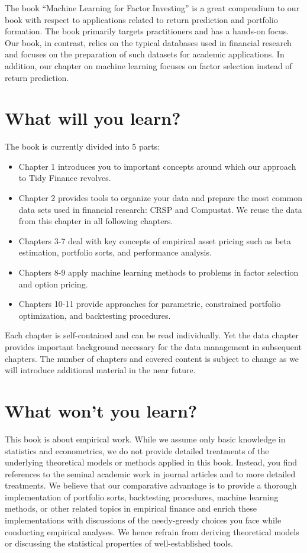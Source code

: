 \documentclass[
]{book}
\providecommand{\tightlist}{%
  \setlength{\itemsep}{0pt}\setlength{\parskip}{0pt}}
\begin{document}
The book ``Machine Learning for Factor Investing'' is a great compendium to our book with respect to applications related to return prediction and portfolio formation. The book primarily targets practitioners and has a hands-on focus. Our book, in contrast, relies on the typical databases used in financial research and focuses on the preparation of such datasets for academic applications. In addition, our chapter on machine learning focuses on factor selection instead of return prediction.

\hypertarget{what-will-you-learn}{%
\section*{What will you learn?}\label{what-will-you-learn}}


The book is currently divided into 5 parts:

\begin{itemize}
\tightlist
\item
  Chapter 1 introduces you to important concepts around which our approach to Tidy Finance revolves.
\item
  Chapter 2 provides tools to organize your data and prepare the most common data sets used in financial research: CRSP and Compustat. We reuse the data from this chapter in all following chapters.
\item
  Chapters 3-7 deal with key concepts of empirical asset pricing such as beta estimation, portfolio sorts, and performance analysis.
\item
  Chapters 8-9 apply machine learning methods to problems in factor selection and option pricing.
\item
  Chapters 10-11 provide approaches for parametric, constrained portfolio optimization, and backtesting procedures.
\end{itemize}

Each chapter is self-contained and can be read individually. Yet the data chapter provides important background necessary for the data management in subsequent chapters. The number of chapters and covered content is subject to change as we will introduce additional material in the near future.

\hypertarget{what-wont-you-learn}{%
\section*{What won't you learn?}\label{what-wont-you-learn}}


This book is about empirical work. While we assume only basic knowledge in statistics and econometrics, we do not provide detailed treatments of the underlying theoretical models or methods applied in this book. Instead, you find references to the seminal academic work in journal articles and to more detailed treatments.
We believe that our comparative advantage is to provide a thorough implementation of portfolio sorts, backtesting procedures, machine learning methods, or other related topics in empirical finance and enrich these implementations with discussions of the needy-greedy choices you face while conducting empirical analyses. We hence refrain from deriving theoretical models or discussing the statistical properties of well-established tools.
\end{document}
